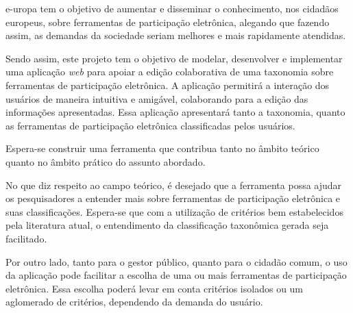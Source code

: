 \acrshort{e-uropa} tem o objetivo de aumentar e disseminar o conhecimento, nos cidadãos europeus, sobre ferramentas de participação eletrônica, alegando que 
fazendo assim, as demandas da sociedade seriam melhores e mais rapidamente atendidas.

Sendo assim, este projeto tem o objetivo de modelar, desenvolver e implementar uma aplicação \textit{web} para apoiar a edição colaborativa de uma taxonomia sobre ferramentas
de participação eletrônica. A aplicação permitirá a interação dos usuários de maneira intuitiva e amigável, colaborando para a edição das informações apresentadas.
Essa aplicação apresentará tanto a taxonomia, quanto as ferramentas de participação eletrônica classificadas pelos usuários.

Espera-se construir uma ferramenta que contribua tanto no âmbito teórico quanto no âmbito prático do assunto abordado. 
\par
No que diz respeito ao campo teórico, é desejado que a ferramenta possa ajudar os pesquisadores a entender mais sobre ferramentas de participação eletrônica e suas classificações. 
Espera-se que com a utilização de critérios bem estabelecidos pela literatura atual, o entendimento da classificação taxonômica gerada seja facilitado.
\par
Por outro lado, tanto para o gestor público, quanto para o cidadão comum, o uso da aplicação pode facilitar a escolha de uma ou mais ferramentas de participação
eletrônica. Essa escolha poderá levar em conta critérios isolados ou um aglomerado de critérios, dependendo da demanda do usuário.

